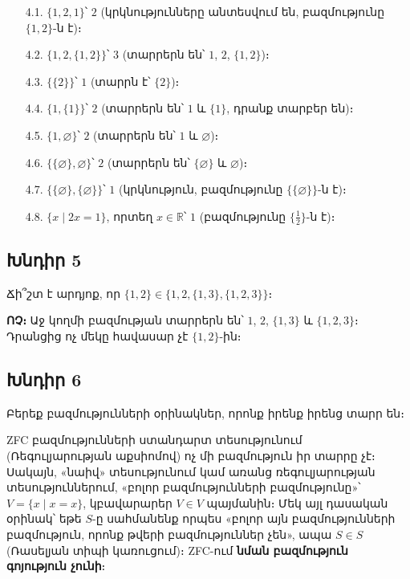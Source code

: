 \begin{itemize}
  \item[4.1.] $\{1,2,1\}$՝ $\boxed{2}$ (կրկնությունները անտեսվում են, բազմությունը $\{1,2\}$-ն է)։
  \item[4.2.] $\{1,2,\{1,2\}\}$՝ $\boxed{3}$ (տարրերն են՝ $1$, $2$, $\{1,2\}$)։
  \item[4.3.] $\{\{2\}\}$՝ $\boxed{1}$ (տարրն է՝ $\{2\}$)։
  \item[4.4.] $\{1,\{1\}\}$՝ $\boxed{2}$ (տարրերն են՝ $1$ և $\{1\}$, դրանք տարբեր են)։
  \item[4.5.] $\{1,\varnothing\}$՝ $\boxed{2}$ (տարրերն են՝ $1$ և $\varnothing$)։
  \item[4.6.] $\{\{\varnothing\},\varnothing\}$՝ $\boxed{2}$ (տարրերն են՝ $\{\varnothing\}$ և $\varnothing$)։
  \item[4.7.] $\{\{\varnothing\},\{\varnothing\}\}$՝ $\boxed{1}$ (կրկնություն, բազմությունը $\{\{\varnothing\}\}$-ն է)։
  \item[4.8.] $\{x \mid 2x=1\}$, որտեղ $x \in \mathbb{R}$՝ $\boxed{1}$ (բազմությունը $\{\tfrac{1}{2}\}$-ն է)։
\end{itemize}

\subsection*{Խնդիր 5}
Ճի՞շտ է արդյոք, որ $\{1,2\} \in \{1,2,\{1,3\},\{1,2,3\}\}$։

\textbf{ՈՉ։} Աջ կողմի բազմության տարրերն են՝ $1$, $2$, $\{1,3\}$ և $\{1,2,3\}$։ Դրանցից ոչ մեկը հավասար չէ $\{1,2\}$-ին։

\subsection*{Խնդիր 6}
Բերեք բազմությունների օրինակներ, որոնք իրենք իրենց տարր են։

ZFC բազմությունների ստանդարտ տեսությունում (Ռեգուլյարության աքսիոմով) ոչ մի բազմություն իր տարրը չէ։ Սակայն, «նաիվ» տեսությունում կամ առանց ռեգուլյարության տեսություններում, «բոլոր բազմությունների բազմությունը»՝ $V = \{x \mid x = x\}$, կբավարարեր $V \in V$ պայմանին։ Մեկ այլ դասական օրինակ՝ եթե $S$-ը սահմանենք որպես «բոլոր այն բազմությունների բազմություն, որոնք թվերի բազմություններ չեն», ապա $S \in S$ (Ռասելյան տիպի կառուցում)։ ZFC-ում \textbf{նման բազմություն գոյություն չունի}։

